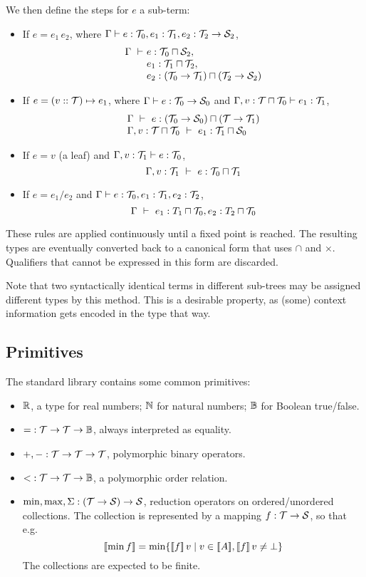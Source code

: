 We then define the  steps for $e$ a sub-term:
\begin{itemize}
  \item If $e=e_1\,e_2$, where $\Gamma \vdash e:\mathcal{T}_0, e_1:\mathcal{T}_1, e_2:\mathcal{T}_2\to\mathcal{S}_2$,
    \[\begin{array}{l@{}l}
        \Gamma ~\vdash~ & e:\T_0\sqcap\S_2, \\ & e_1:\T_1\sqcap\T_2, \\ & e_2:(\T_0\to\T_1)\sqcap(\T_2\to\S_2)
      \end{array}\]
  \item If $e=(v::\mathcal{T})\mapsto e_1$, where $\Gamma\vdash e:\mathcal{T}_0\to\mathcal{S}_0$ and $\Gamma,v:\mathcal{T}\sqcap\mathcal{T}_0\vdash e_1:\mathcal{T}_1$,
    \[\begin{array}{l}\Gamma ~\vdash~ e:(\mathcal{T}_0\to\mathcal{S}_0)\sqcap(\mathcal{T}\to\mathcal{T}_1)\\
      \Gamma,v:\mathcal{T}\sqcap\mathcal{T}_0 ~\vdash~ e_1:\mathcal{T}_1\sqcap\mathcal{S}_0 \end{array}\]
  \item If $e=v$ (a leaf) and $\Gamma,v:\mathcal{T}_1\vdash e:\mathcal{T}_0$,
    \[\Gamma,v:\mathcal{T}_1 ~\vdash~ e:\mathcal{T}_0\sqcap\mathcal{T}_1\]
  \item If $e=e_1/e_2$ and $\Gamma\vdash e:\mathcal{T}_0, e_1:\mathcal{T}_1, e_2:\mathcal{T}_2$,
    \[\Gamma ~\vdash~ e_1:T_1\sqcap\mathcal{T}_0, e_2:T_2\sqcap\mathcal{T}_0\]
\end{itemize}

These rules are applied continuously until a fixed point is reached.
The resulting types are eventually converted back to a canonical form that uses $\cap$ and $\times$.
Qualifiers that cannot be expressed in this form are discarded.

Note that two syntactically identical terms in different sub-trees may be assigned
different types by this method. This is a desirable property, as (some) context information
gets encoded in the type that way.

\subsection{Primitives}

The standard library contains some common primitives:

\begin{itemize}
  \item $\mathbb{R}$, a type for real numbers; $\mathbb{N}$ for natural numbers; $\mathbb{B}$ for Boolean true/false.
  \item ${=} : \mathcal{T}\to\mathcal{T}\to\mathbb{B}$, always interpreted as equality.
  \item ${+}, {-} : \mathcal{T}\to\mathcal{T}\to\mathcal{T}$, polymorphic binary operators.
  \item ${<} : \mathcal{T}\to\mathcal{T}\to\mathbb{B}$, a polymorphic order relation.
  \item $\min, \max, \Sigma : (\mathcal{T}\to\mathcal{S})\to\mathcal{S}$, reduction operators
    on ordered/unordered collections. The collection is represented by a mapping $f : \mathcal{T}\to\mathcal{S}$,
    so that e.g. \[\semp{\min f} = \min \{\semp{f}\,v \;|\; v\in\semp{A}, \semp{f}\,v\neq\bot\}\]
    The collections are expected to be finite.
\end{itemize}

